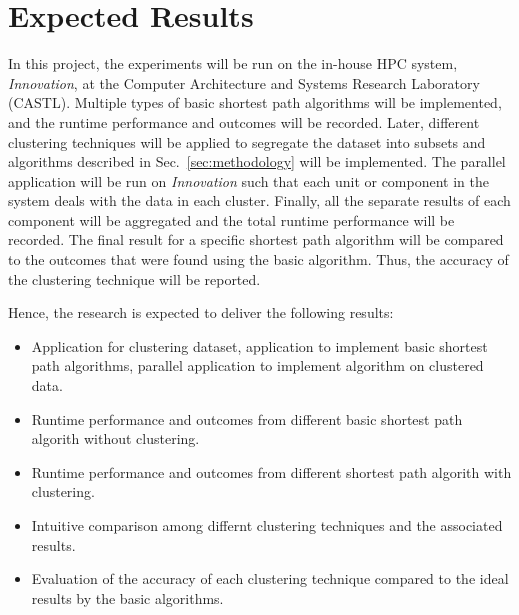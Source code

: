\section{Expected Results}
\label{sec:expected_results}

In this project, the experiments will be run on the
in-house HPC system, \textit{Innovation}, at the Computer Architecture
and Systems Research Laboratory (CASTL). Multiple types of basic
shortest path algorithms will be implemented, and the runtime
performance and outcomes will be recorded.
Later, different clustering techniques will be applied to segregate
the dataset into subsets and algorithms described in Sec.~\ref{sec:methodology}
will be implemented. The parallel application will be run on \textit{Innovation}
such that each unit or component in the system deals with the data in each cluster.
Finally, all the separate results of each component will be aggregated and the total
runtime performance will be recorded. The final result for a specific
shortest path algorithm will be compared to the outcomes that were found
using the basic algorithm. Thus, the accuracy of the clustering technique will
be reported.

Hence, the research is expected to deliver the following results:
\begin{itemize}
    \item Application for clustering dataset, application to implement basic shortest path algorithms, parallel application to implement algorithm on clustered data.
    \item Runtime performance and outcomes from different basic shortest path algorith without clustering.
    \item Runtime performance and outcomes from different shortest path algorith with clustering.
    \item Intuitive comparison among differnt clustering techniques and the associated results.
    \item Evaluation of the accuracy of each clustering technique compared to the ideal results by the basic algorithms.
\end{itemize}
